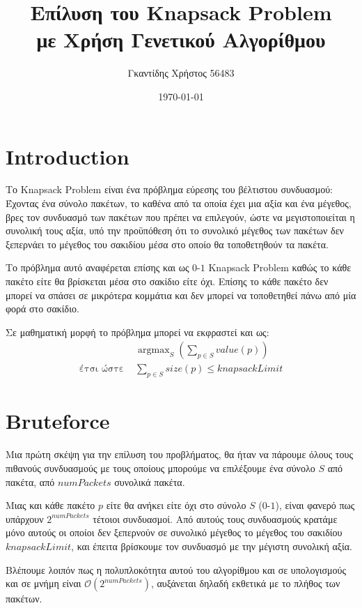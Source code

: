 \documentclass{article}
\title{Επίλυση του Knapsack Problem\\με Χρήση Γενετικού Αλγορίθμου}
\date{\today}
\author{Γκαντίδης Χρήστος 56483}
\DeclareMathOperator*{\argmax}{argmax}
\begin{document}
\maketitle
\newpage

\tableofcontents
\newpage


\section{Introduction}

Το \textenglish{Knapsack Problem} είναι ένα πρόβλημα εύρεσης του βέλτιστου
συνδυασμού: Έχοντας ένα σύνολο πακέτων, το καθένα από τα οποία έχει μια αξία και
ένα μέγεθος, βρες τον συνδυασμό των πακέτων που πρέπει να επιλεγούν, ώστε να
μεγιστοποιείται η συνολική τους αξία, υπό την προϋπόθεση ότι το συνολικό μέγεθος
των πακέτων δεν ξεπερνάει το μέγεθος του σακιδίου μέσα στο οποίο θα τοποθετηθούν
τα πακέτα.

Το πρόβλημα αυτό αναφέρεται επίσης και ως $0$-$1$ \textenglish{Knapsack
Problem} καθώς το κάθε πακέτο είτε θα βρίσκεται μέσα στο σακίδιο είτε όχι.
Επίσης το κάθε πακέτο δεν μπορεί να σπάσει σε μικρότερα κομμάτια και δεν μπορεί
να τοποθετηθεί πάνω από μία φορά στο σακίδιο.

Σε μαθηματική μορφή το πρόβλημα μπορεί να εκφραστεί και ως:
\begin{align*}
    &\argmax_{S}\left(\sum_{p \in S}value(p)\right)\\
    \text{έτσι ώστε } &\sum_{p \in S}size(p) \leq knapsackLimit
\end{align*}

\section{Bruteforce}

Μια πρώτη σκέψη για την επίλυση του προβλήματος, θα ήταν να πάρουμε όλους τους
πιθανούς συνδυασμούς με τους οποίους μπορούμε να επιλέξουμε ένα σύνολο $S$ από
πακέτα, από $numPackets$ συνολικά πακέτα.

Μιας και κάθε πακέτο $p$ είτε θα ανήκει είτε όχι στο σύνολο $S$ ($0$-$1$), είναι
φανερό πως υπάρχουν $2^{numPackets}$ τέτοιοι συνδυασμοί. Από αυτούς τους
συνδυασμούς κρατάμε μόνο αυτούς οι οποίοι δεν ξεπερνούν σε συνολικό μέγεθος το
μέγεθος του σακιδίου $knapsackLimit$, και έπειτα βρίσκουμε τον συνδυασμό με την
μέγιστη συνολική αξία.

Βλέπουμε λοιπόν πως η πολυπλοκότητα αυτού του αλγορίθμου και σε υπολογισμούς και
σε μνήμη είναι $\mathcal{O}\left(2^{numPackets}\right)$, αυξάνεται δηλαδή
εκθετικά με το πλήθος των πακέτων.
\end{document}
